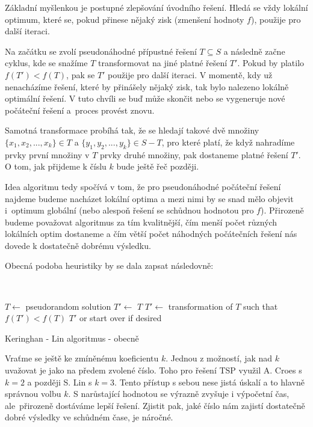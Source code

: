 \documentclass[
  printversion=false,
  joinlists=true,
  glossaries=true,
  figures=true,
  tables=true,
  sourcecodes=false,
  theorems=false,
  bibencoding=utf8,
  language=czech,
  encoding=utf8,
  program=infpvs,
  index=true,
  biblatex=true
]{kidiplom}
\begin{document}
Základní myšlenkou je postupné zlepšování úvodního řešení. Hledá se vždy lokální optimum, které se, pokud přinese nějaký zisk (zmenšení hodnoty $f$), použije pro další iteraci.

Na začátku se zvolí pseudonáhodné přípustné řešení $T \subseteq S$ a následně začne cyklus, kde se snažíme $T$ transformovat na jiné platné řešení $T'$. Pokud by platilo $f(T') < f(T)$, pak se $T'$ použije pro další iteraci. V momentě, kdy už nenacházíme řešení, které by přinášely nějaký zisk, tak bylo nalezeno lokálně optimální řešení. V tuto chvíli se buď může skončit nebo se vygeneruje nové počáteční řešení a~proces provést znovu.

\sloppy Samotná transformace probíhá tak, že se hledají takové dvě množiny $\{{x_1, x_2, ..., x_k\} \in T}$ a $\{y_1, y_2, ..., y_k\} \in S - T$, pro které platí, že když nahradíme prvky první množiny v $T$ prvky druhé množiny, pak dostaneme platné řešení $T'$. O tom, jak přijdeme k číslu $k$ bude ještě řeč později.

Idea algoritmu tedy spočívá v tom, že pro pseudonáhodné počáteční řešení najdeme budeme nacházet lokální optima a mezi nimi by se snad mělo objevit i~optimum globální (nebo alespoň řešení se schůdnou hodnotou pro $f$). Přirozeně budeme považovat algoritmus za tím kvalitnější, čím menší počet různých lokálních optim dostaneme a čím větší počet náhodných počátečních řešení nás dovede k dostatečně dobrému výsledku.

Obecná podoba heuristiky by se dala zapsat následovně:\newline


{\LinesNumbered\SetAlgoNoLine\
\begin{algorithm}[H]
$T \leftarrow$ pseudorandom solution\;
$T' \leftarrow$ $T$\;
{
	$T' \leftarrow$ transformation of $T$ such that $f(T') < f(T)$\;
}
\Return $T'$ or start over if desired\;
\caption{Keringhan - Lin algoritmus - obecně}
\end{algorithm}
}\leavevmode\newline

Vraťme se ještě ke zmíněnému koeficientu $k$. Jednou z možností, jak nad $k$ uvažovat je jako na předem zvolené číslo. Toho pro řešení TSP využil A. Croes s~$k = 2$ a později S. Lin s $k = 3$. Tento přístup s sebou nese jistá úskalí a to hlavně správnou volbu $k$. S narůstající hodnotou se výrazně zvyšuje i výpočetní čas, ale~přirozeně dostáváme lepší řešení. Zjistit pak, jaké číslo nám zajistí dostatečně dobré výsledky ve schůdném čase, je náročné.
\end{document}
